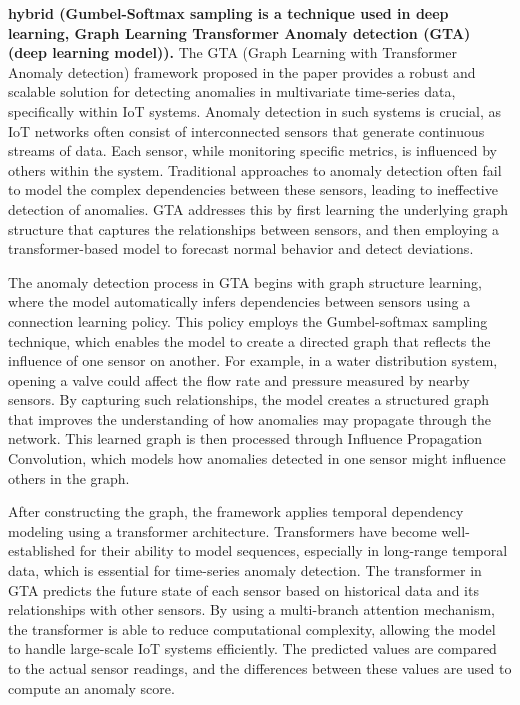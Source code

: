 \textbf{ hybrid (Gumbel-Softmax sampling is a technique used in deep learning, Graph Learning Transformer Anomaly detection (GTA) (deep learning model)).} The GTA (Graph Learning with Transformer Anomaly detection) framework proposed in the paper provides a robust and scalable solution for detecting anomalies in multivariate time-series data, specifically within IoT systems. Anomaly detection in such systems is crucial, as IoT networks often consist of interconnected sensors that generate continuous streams of data. Each sensor, while monitoring specific metrics, is influenced by others within the system. Traditional approaches to anomaly detection often fail to model the complex dependencies between these sensors, leading to ineffective detection of anomalies. GTA addresses this by first learning the underlying graph structure that captures the relationships between sensors, and then employing a transformer-based model to forecast normal behavior and detect deviations.

The anomaly detection process in GTA begins with graph structure learning, where the model automatically infers dependencies between sensors using a connection learning policy. This policy employs the Gumbel-softmax sampling technique, which enables the model to create a directed graph that reflects the influence of one sensor on another. For example, in a water distribution system, opening a valve could affect the flow rate and pressure measured by nearby sensors. By capturing such relationships, the model creates a structured graph that improves the understanding of how anomalies may propagate through the network. This learned graph is then processed through Influence Propagation Convolution, which models how anomalies detected in one sensor might influence others in the graph.

After constructing the graph, the framework applies temporal dependency modeling using a transformer architecture. Transformers have become well-established for their ability to model sequences, especially in long-range temporal data, which is essential for time-series anomaly detection. The transformer in GTA predicts the future state of each sensor based on historical data and its relationships with other sensors. By using a multi-branch attention mechanism, the transformer is able to reduce computational complexity, allowing the model to handle large-scale IoT systems efficiently. The predicted values are compared to the actual sensor readings, and the differences between these values are used to compute an anomaly score.

